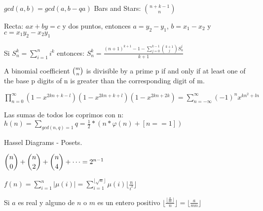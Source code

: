 {\normalsize
    $ gcd(a,b) = gcd(a, b-qa)$
    \hspace{4em} Bars and Stars: $ \binom{n+k-1}{n} $
    
    Recta: $ax + by = c$ y dos puntos, entonces $a = y_2-y_1$, $b = x_1-x_2$ y $c = x_1y_2-x_2y_1$
    
    Si $S_{n}^{k} = \sum_{i=1}^{n} i^k$ entonces: $S_{n}^{k} = \frac{ (n+1)^{k+1} - 1 - \sum_{j=0}^{k-1} {{k+1} \choose j} S_n^j }{ k+1 }$

    A binomial coefficient ${\tbinom {m}{n}}$ is divisible by a prime p if and only if at least one of the base p digits of n is greater than the corresponding digit of m.

    $\displaystyle\prod_{n=0}^{\infty} (1-x^{2kn+k-l})(1-x^{2kn+k+l})(1-x^{2kn+2k}) = \displaystyle\sum_{n=-\infty}^{\infty}(-1)^nx^{kn^2+ln}$

    Las sumas de todos los coprimos con n: $\displaystyle h(n) = \sum_{gcd(n,q)=1} q = \frac{1}{2} * (n  * \varphi(n) + [n==1])$

    Hassel Diagrams - Posets.

    $\dbinom n 0 + \dbinom n 2 + \dbinom n 4 + \dotsb = 2^{n - 1}$

    $\displaystyle f(n) = \sum_{i=1}^{n} |\mu(i)| = \sum_{i=1}^{  \lfloor \sqrt{n} \rfloor} \mu(i) \lfloor \frac{n}{i^2} \rfloor$

    Si $a$ es real y alguno de $n$ o $m$ es un entero positivo $\displaystyle \lfloor \frac{\lfloor \frac{a}{m} \rfloor }{n} \rfloor = \lfloor \frac{a}{mn} \rfloor$
}